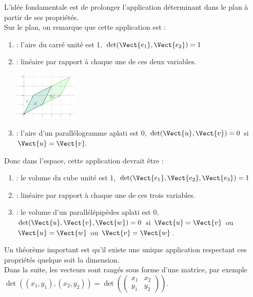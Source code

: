 \documentclass{book}
\begin{document}
L'idée fondamentale est de prolonger l'application  déterminant dans le plan à partir de ses propriétés.\\ 
Sur le plan, on remarque que cette application est :
\begin{enumerate}
\item {} : l'aire du carré unité est 1, $\det(\Vect{e_1},\Vect{e_2})=1$
\item {} : linéaire par rapport à chaque une de ces deux variables.
\begin{center}
\includegraphics[width=3cm]{determinant2.png}
\end{center}
\item {} : l'aire d'un parallélogramme aplati est 0, $\det(\Vect{u},\Vect{v})=0$ si $\Vect{u}=\Vect{v}.$
\end{enumerate}
Donc dans l'espace, cette application devrait être :
\begin{enumerate}
\item {} : le volume du cube unité est 1, $\det(\Vect{e_1},\Vect{e_2},\Vect{e_3})=1$
\item {} : linéaire par rapport à chaque une de ces trois variables.
\item {} : le volume d'un parallélépipèdes aplati est 0,  $\det(\Vect{u},\Vect{v},\Vect{w})=0$ si $\Vect{u}=\Vect{v}$ ou $\Vect{u}=\Vect{w}$ ou $\Vect{v}=\Vect{w}$.
\end{enumerate}
Un théorème important est qu'il existe une unique application respectant ces propriétés quelque soit la dimension.\\
Dans la suite, les vecteurs sont rangés sous forme d'une matrice, par exemple $\det((x_1,y_1),(x_2,y_2))=\det(\begin{pmatrix}
x_1 & x_2 \\
y_1 & y_2
\end{pmatrix}).$ 


 
\end{document}
